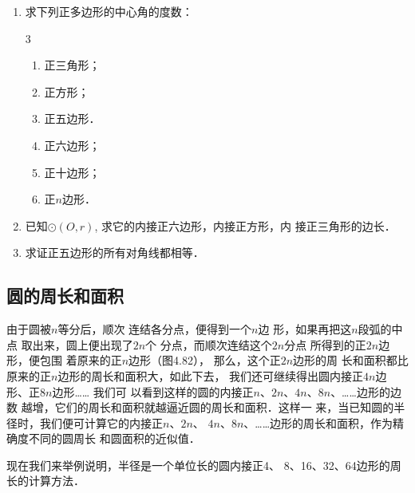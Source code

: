 \begin{ex}
\begin{enumerate}
\item  求下列正多边形的中心角的度数：
\begin{multicols}{3}
\begin{enumerate}
\item 正三角形；  \item 正方形；
\item 正五边形．
\item 正六边形；  \item 正十边形；  \item 正$n$边形．
\end{enumerate}
\end{multicols}

  \item 已知$\odot (O,r)$, 求它的内接正六边形，内接正方形，内
  接正三角形的边长．
  \item 求证正五边形的所有对角线都相等．
\end{enumerate}
\end{ex}

\subsection{圆的周长和面积}
由于圆被$n$等分后，顺次
连结各分点，便得到一个$n$边
形，如果再把这$n$段弧的中点
取出来，圆上便出现了$2n$个
分点，而顺次连结这个$2n$分点
所得到的正$2n$边形，便包围
着原来的正$n$边形（图4.82），
那么，这个正$2n$边形的周
长和面积都比原来的正$n$边形的周长和面积大，如此下去，
我们还可继续得出圆内接正$4n$边形、正$8n$边形…… 我们可
以看到这样的圆的内接正$n$、$2n$、$4n$、$8n$、……边形的边数
越增，它们的周长和面积就越逼近圆的周长和面积．这样一
来，当已知圆的半径时，我们便可计算它的内接正$n$、$2n$、
$4n$、$8n$、……边形的周长和面积，作为精确度不同的圆周长
和圆面积的近似值．

现在我们来举例说明，半径是一个单位长的圆内接正4、
8、16、32、64边形的周长的计算方法．

\begin{figure}[htp]
  \centering
{}
  \caption{}
\end{figure}

